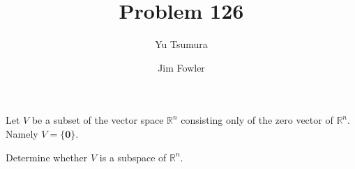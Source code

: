 \documentclass{ximera}
\title{Problem 126}
\author{Yu Tsumura \and Jim Fowler}
\begin{document}
\begin{problem}
  
  Let $V$ be a subset of the vector space $\mathbb{R}^n$ consisting
  only of the zero vector of $\mathbb{R}^n$. Namely
  $V=\{\mathbf{0}\}$.

  Determine whether $V$ is a subspace of $\mathbb{R}^n$.
	  
  \begin{multipleChoice}
  \end{multipleChoice}

\end{problem}

		
\end{document}
